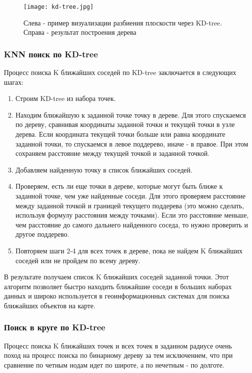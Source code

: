 \begin{figure}[h]
    \centering
    \texttt{[image: kd-tree.jpg]}
    \caption{Слева - пример визуализации разбиения плоскости через KD-tree. Справа - результат построения дерева}
\end{figure}

\subsubsection{KNN поиск по KD-tree}

Процесс поиска K ближайших соседей по KD-tree заключается в следующих шагах:

\begin{enumerate}
    \item Строим KD-tree из набора точек.
    \item Находим ближайшую к заданной точке точку в дереве. Для этого спускаемся по дереву, сравнивая координаты заданной точки и текущей точки в узле дерева. Если координата текущей точки больше или равна координате заданной точки, то спускаемся в левое поддерево, иначе - в правое. При этом сохраняем расстояние между текущей точкой и заданной точкой.
    \item Добавляем найденную точку в список ближайших соседей.
    \item Проверяем, есть ли еще точки в дереве, которые могут быть ближе к заданной точке, чем уже найденные соседи. Для этого проверяем расстояние между заданной точкой и границей текущего поддерева (это можно сделать, используя формулу расстояния между точками). Если это расстояние меньше, чем расстояние до самого дальнего найденного соседа, то нужно проверить и другое поддерево.
    \item Повторяем шаги 2-4 для всех точек в дереве, пока не найдем K ближайших соседей или не пройдем по всему дереву.
\end{enumerate}

В результате получаем список K ближайших соседей заданной точки. Этот алгоритм позволяет быстро находить ближайшие соседи в больших наборах данных и широко используется в геоинформационных системах для поиска ближайших объектов на карте.

\subsubsection{Поиск в круге по KD-tree}
Процесс поиска K ближайших точек и всех точек в заданном радиусе очень поход на процесс поиска по бинарному дереву за тем исключением, что при сравнение по четным нодам идет по широте, а по нечетным - по долготе.

